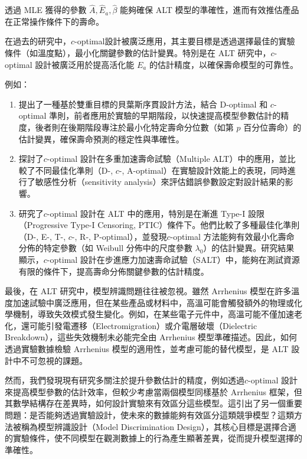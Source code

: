 透過 MLE 獲得的參數 $\hat{A}, \hat{E}_a, \hat{\beta}$ 能夠確保 ALT 模型的準確性，進而有效推估產品在正常操作條件下的壽命。

在過去的研究中，$c$-optimal設計被廣泛應用，其主要目標是透過選擇最佳的實驗條件（如溫度點），最小化關鍵參數的估計變異。特別是在 ALT 研究中，$c$-optimal 設計被廣泛用於提高活化能 $E_a$ 的估計精度，以確保壽命模型的可靠性。

例如：
\begin{enumerate}

\item \cite{lu2019bayesian} 提出了一種基於雙重目標的貝葉斯序貫設計方法，結合 D-optimal 和 $c$-optimal 準則，前者應用於實驗的早期階段，以快速提高模型參數估計的精度，後者則在後期階段專注於最小化特定壽命分位數（如第 $p$ 百分位壽命）的估計變異，確保壽命預測的穩定性與準確性。

\item \cite{abd2020optimal} 探討了$c$-optimal 設計在多重加速壽命試驗（Multiple ALT）中的應用，並比較了不同最佳化準則（D-, $c$-, A-optimal）在實驗設計效能上的表現，同時進行了敏感性分析（sensitivity analysis）來評估錯誤參數設定對設計結果的影響。

\item \cite{newer2024optimal} 研究了$c$-optimal 設計在 ALT 中的應用，特別是在漸進 Type-I 設限（Progressive Type-I Censoring, PTIC）條件下。他們比較了多種最佳化準則（D-, E-, T-, $c$-, R-, P-optimal），並發現$c$-optimal 方法能夠有效最小化壽命分佈的特定參數（如 Weibull 分佈中的尺度參數 $\lambda_0$）的估計變異。研究結果顯示，$c$-optimal 設計在步進應力加速壽命試驗（SALT）中，能夠在測試資源有限的條件下，提高壽命分佈關鍵參數的估計精度。

\end{enumerate}

\hspace*{8mm} 最後，在 ALT 研究中，模型辨識問題往往被忽視。雖然 Arrhenius 模型在許多溫度加速試驗中廣泛應用，但在某些產品或材料中，高溫可能會觸發額外的物理或化學機制，導致失效模式發生變化。例如，在某些電子元件中，高溫可能不僅加速老化，還可能引發電遷移（Electromigration）或介電層破壞（Dielectric Breakdown），這些失效機制未必能完全由 Arrhenius 模型準確描述。因此，如何透過實驗數據檢驗 Arrhenius 模型的適用性，並考慮可能的替代模型，是 ALT 設計中不可忽視的課題。

\hspace*{8mm} 然而，我們發現現有研究多關注於提升參數估計的精度，例如透過$c$-optimal 設計來提高模型參數的估計效率，但較少考慮當兩個模型同樣基於 Arrhenius 框架，但其數學結構存在差異時，如何設計實驗來有效區分這些模型。這引出了另一個重要問題：是否能夠透過實驗設計，使未來的數據能夠有效區分這類競爭模型？這類方法被稱為模型辨識設計（Model Discrimination Design），其核心目標是選擇合適的實驗條件，使不同模型在觀測數據上的行為產生顯著差異，從而提升模型選擇的準確性。

